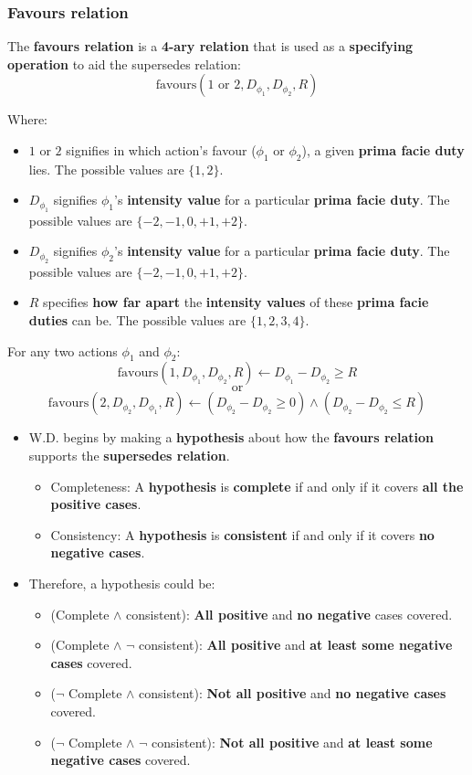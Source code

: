 \documentclass[11pt]{article}
\begin{document}
\subsubsection{Favours relation}
\label{sec:org1cd416e}
The \textbf{favours relation} is a \textbf{4-ary relation} that is used as a \textbf{specifying operation} to aid the supersedes relation:
\[\text{favours}(1 \text{ or } 2, D_{\phi_1}, D_{\phi_2}, R)\]

Where:
\begin{itemize}
\item \(1\) or \(2\) signifies in which action's favour (\(\phi_1\) or \(\phi_2\)), a given \textbf{prima facie duty} lies. The possible values are \(\{1, 2\}\).
\item \(D_{\phi_1}\) signifies \(\phi_1\)'s \textbf{intensity value} for a particular \textbf{prima facie duty}. The possible values are \(\{-2, -1, 0, +1, +2\}\).
\item \(D_{\phi_2}\) signifies \(\phi_2\)'s \textbf{intensity value} for a particular \textbf{prima facie duty}. The possible values are \(\{-2, -1, 0, +1, +2\}\).
\item \(R\) specifies \textbf{how far apart} the \textbf{intensity values} of these \textbf{prima facie duties} can be. The possible values are \(\{1, 2, 3, 4\}\).
\end{itemize}

For any two actions \(\phi_1\) and \(\phi_2\):
\[\text{favours}(1, D_{\phi_1}, D_{\phi_2}, R) \leftarrow D_{\phi_1} - D_{\phi_2} \ge R\]
\[\text{or}\]
\[\text{favours}(2, D_{\phi_2}, D_{\phi_1}, R) \leftarrow (D_{\phi_2} - D_{\phi_2} \ge 0) \wedge (D_{\phi_2} - D_{\phi_2} \le R)\]

\begin{itemize}
\item W.D. begins by making a \textbf{hypothesis} about how the \textbf{favours relation} supports the \textbf{supersedes relation}.
\begin{itemize}
\item Completeness: A \textbf{hypothesis} is \textbf{complete} if and only if it covers \textbf{all the positive cases}.
\item Consistency: A \textbf{hypothesis} is \textbf{consistent} if and only if it covers \textbf{no negative cases}.
\end{itemize}
\item Therefore, a hypothesis could be:
\begin{itemize}
\item (Complete \(\wedge\) consistent): \textbf{All positive} and \textbf{no negative} cases covered.
\item (Complete \(\wedge\) \(\neg\) consistent): \textbf{All positive} and \textbf{at least some negative cases} covered.
\item (\(\neg\) Complete \(\wedge\) consistent): \textbf{Not all positive} and \textbf{no negative cases} covered.
\item (\(\neg\) Complete \(\wedge\) \(\neg\) consistent): \textbf{Not all positive} and \textbf{at least some negative cases} covered.
\end{itemize}
\end{itemize}
\end{document}
